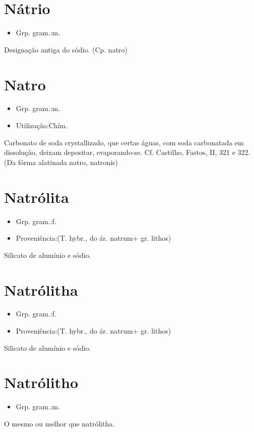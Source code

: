 \section{Nátrio}
\begin{itemize}
\item {Grp. gram.:m.}
\end{itemize}
Designação antiga do sódio.
(Cp. \textunderscore natro\textunderscore )
\section{Natro}
\begin{itemize}
\item {Grp. gram.:m.}
\end{itemize}
\begin{itemize}
\item {Utilização:Chím.}
\end{itemize}
Carbonato de soda crystallizado, que certas águas, com soda carbonatada em dissolução, deixam depositar, evaporando-se. Cf. Castilho, \textunderscore Fastos\textunderscore , II, 321 e 322.
(Da fórma alatinada \textunderscore natro\textunderscore , \textunderscore natronis\textunderscore )
\section{Natrólita}
\begin{itemize}
\item {Grp. gram.:f.}
\end{itemize}
\begin{itemize}
\item {Proveniência:(T. hybr., do ár. \textunderscore natrum\textunderscore  + gr. \textunderscore lithos\textunderscore )}
\end{itemize}
Silicato de alumínio e sódio.
\section{Natrólitha}
\begin{itemize}
\item {Grp. gram.:f.}
\end{itemize}
\begin{itemize}
\item {Proveniência:(T. hybr., do ár. \textunderscore natrum\textunderscore  + gr. \textunderscore lithos\textunderscore )}
\end{itemize}
Silicato de alumínio e sódio.
\section{Natrólitho}
\begin{itemize}
\item {Grp. gram.:m.}
\end{itemize}
O mesmo ou melhor que \textunderscore natrólitha\textunderscore .
